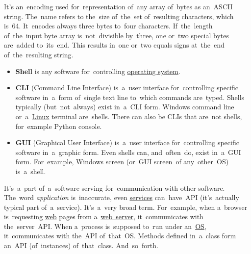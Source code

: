\label{base64}
It's an~encoding used for~representation of~any array of~bytes as an~ASCII string. The~name refers to the~size of~the~set of~resulting characters, which is~64. It~encodes always three bytes to~four characters. If~the~length of~the~input byte array is~not~divisible by~three, one or~two special bytes are~added to~its~end. This results in~one or~two equals signs at~the~end of~the~resulting string.

\label{shellcligui}
\begin{itemize}
    \item \textbf{Shell} is any software for~controlling \hyperref[os]{operating system}.
    \item \textbf{CLI} (Command Line Interface) is~a~user interface for~controlling specific software in~a~form of~single text line to~which commands are~typed. Shells typically (but~not~always) exist in~a~CLI form. Windows command line or~a~\hyperref[unixlinux]{Linux} terminal are~shells. There can also be CLIs that are~not shells, for~example Python console.
    \item \textbf{GUI} (Graphical User Interface) is~a~user interface for~controlling specific software in~a~graphic form. Even shells can, and~often~do, exist in~a~GUI form. For~example, Windows screen (or~GUI screen~of any~other~\hyperref[os]{OS}) is~a~shell.
\end{itemize}

\label{api}
It's~a~part of~a~software serving for~communication with other software. The~word \textit{application} is~inaccurate, even \hyperref[applicationprocessprogramservicethread]{services} can~have~API (it's~actually typical part of~a~service). It's~a~very broad term. For~example, when a~browser is~requesting \hyperref[internetweb]{web} pages from a~\hyperref[webserver]{web~server}, it~communicates with the~server~API. When a~process is~supposed to~run under an~\hyperref[os]{OS}, it~communicates with the~API of~that~OS. Methods defined in~a~class form an~API (of~instances) of~that~class. And~so~forth.
